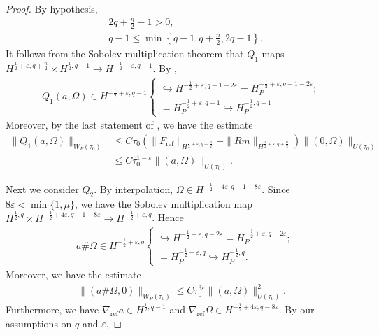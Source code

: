 \documentclass[12pt]{amsart}
\renewcommand{\1}{{\mathbf 1}}
\theoremstyle{others}
\numberwithin{equation}{section}
\newcommand{\inj}{\hookrightarrow}
\begin{document}
\begin{proof}
By hypothesis,
\begin{align*}
    &2q+ \frac{n}{2}-1 > 0, \\
    &q - 1 \leq \min\left\{q-1, q + \frac{n}{2},  2q -1\right\}.
\end{align*} It follows from the Sobolev multiplication theorem \cite[Prop. D.7]{radethesis} that \(Q_1\) maps \(H^{\frac{1}{2} + \varepsilon, q + \frac{n}{2}} \times H^{\frac{1}{2}, q - 1} \to H^{-\frac{1}{2} + \varepsilon, q - 1}\). By \cite[(70)]{radethesis},
\begin{align*}
    Q_1(a, \Omega) \in H^{-\frac{1}{2} + \varepsilon, q - 1}
    \begin{cases}
        \inj H^{-\frac{1}{2} + \varepsilon, q-1 - 2\varepsilon} =  H_P^{-\frac{1}{2} + \varepsilon, q-1-2\varepsilon}; \\
        = H_P^{-\frac{1}{2}+\varepsilon, q-1} \inj H_P^{-\frac{1}{2}, q-1}.
    \end{cases}
\end{align*} Moreover, by the last statement of \cite[Prop. D.7]{radethesis}, we have the estimate
\begin{align*}
    \|Q_1(a, \Omega)\|_{W_P(\tau_0)} &\leq C \tau_0(\|F_{\text{ref}}\|_{H^{\frac{1}{2} + \varepsilon, q+\frac{n}{2}}} + \|Rm\|_{H^{\frac{1}{2} + \varepsilon, q+\frac{n}{2}}})\|(0, \Omega)\|_{U(\tau_0)} \\
    &\leq C \tau_0^{1 - \varepsilon}\|(a, \Omega)\|_{U(\tau_0)}.
\end{align*} \par
Next we consider \(Q_2\). By interpolation, \(\Omega \in H^{-\frac{1}{2}+4\varepsilon, q+1-8\varepsilon}\). Since \(8\varepsilon < \min\{1, \mu\}\), we have
the Sobolev multiplication map \(H^{\frac{1}{2}, q} \times H^{-\frac{1}{2} + 4\varepsilon, q+1-8\varepsilon} \to H^{-\frac{1}{2} + \varepsilon, q}\). Hence
\begin{align*}
    &a \# \Omega \in H^{-\frac{1}{2} + \varepsilon, q}
    \begin{cases}
        \inj H^{-\frac{1}{2} + \varepsilon, q - 2\varepsilon} = H_P^{-\frac{1}{2} + \varepsilon, q-2\varepsilon} ; \\
        = H_P^{-\frac{1}{2} + \varepsilon, q}\inj H_P^{-\frac{1}{2}, q}. 
    \end{cases}
\end{align*} Moreover, we have the estimate 
\begin{align*}
    \|(a \# \Omega, 0)\|_{W_P(\tau_0)} \leq C \tau_0^{3\varepsilon}\|(a, \Omega)\|_{U(\tau_0)}^2.
\end{align*} Furthermore, we have \(\nabla_{\text{ref}} a \in H^{\frac{1}{2}, q-1}\) and \(\nabla_{\text{ref}} \Omega \in H^{-\frac{1}{2} + 4\varepsilon, q-8\varepsilon}\). By our assumptions on \(q\) and \(\varepsilon\),

\end{proof}
\end{document}
